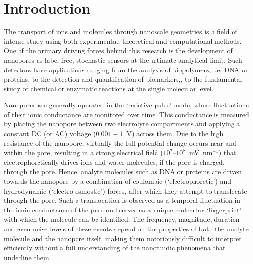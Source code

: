 \documentclass[journal=ancac3,manuscript=article,etalmode=truncate,maxauthors=0,layout=twocolumn]{achemso}
\begin{document}
\section{Introduction}

The transport of ions and molecules through nanoscale geometries is a field of intense study using both
experimental, theoretical and computational methods.\cite{Sparreboom-2010,Bocquet-2010,Maffeo-2012,
Thomas-2014,Wang-2014,Kim-2015} One of the primary driving forces behind this research is the development of
nanopores as label-free, stochastic sensors at the ultimate analytical limit.\cite{Bayley-2001,
Dekker-2007,Venkatesan-2011,Zhang-2016} Such detectors have applications ranging from the analysis of
biopolymers, i.e. DNA\cite{Deamer-2016,Kasianowicz-1996,Meller-2000,Maglia-2008,Butler-2008,Stoddart-2009,
Franceschini-2013,Jain-2018} or proteins\cite{Restrepo-Perez-2018,Talaga-2009,Rodriguez-Larrea-2013,
Nivala-2013,Kennedy-2016}, to the detection and quantification of biomarkers,\cite{Chen-2013,Soskine-2012,
Niedzwiecki-2013,VanMeervelt-2014,Huang-2017,Liu-2018,Galenkamp-2018}, to the fundamental study of chemical or
enzymatic reactions at the single molecular level.\cite{Willems-VanMeervelt-2017,Lieberman-2010,
Nivala-2013,Ho-2015,Laszlo-2017}

Nanopores are generally operated in the `resistive-pulse' mode, where fluctuations of their ionic conductance
are monitored over time.\cite{Bayley-2001,Dekker-2007,Maglia-2010,Venkatesan-2011} This conductance is
measured by placing the nanopore between two electrolyte compartments and applying a constant DC (or AC)
voltage ($0.001-1$~V) across them. Due to the high resistance of the nanopore, virtually the full potential
change occurs near and within the pore, resulting in a strong electrical field ($10^7$--$10^8$~mV~nm$^{-1}$)
that electrophoretically drives ions and water molecules, if the pore is charged, through the
pore.\cite{Wong-2007,Mao-2014,Haywood-2014,Laohakunakorn-2015} Hence, analyte molecules such as DNA or
proteins are driven towards the nanopore by a combination of coulombic (`electrophoretic') and hydrodynamic
(`electro-osmostic') forces, after which they attempt to translocate through the
pore.\cite{Wong-2007,Grosberg-2010,Muthukumar-2010,Muthukumar-2014} Such a translocation is observed as a
temporal fluctuation in the ionic conductance of the pore and serves as a unique molecular `fingerprint' with
which the molecule can be identified.\cite{Yusko-2017} The frequency, magnitude, duration and even noise
levels of these events depend on the properties of both the analyte molecule and the nanopore itself, making
them notoriously difficult to interpret efficiently without a full understanding of the nanofluidic phenomena
that underline them.
\end{document}
